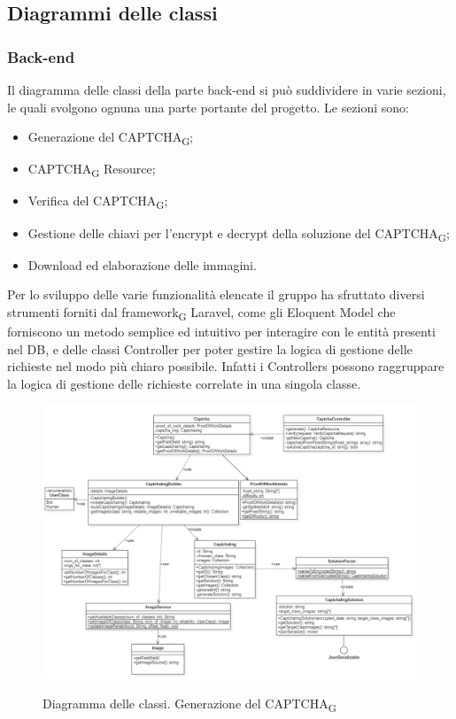 \subsection{Diagrammi delle classi}

\subsubsection{Back-end}

Il diagramma delle classi della parte back-end si può suddividere in varie sezioni, le quali svolgono ognuna una parte portante del progetto. Le sezioni sono:
\begin{itemize}
    \item Generazione del CAPTCHA\textsubscript{G};
    \item CAPTCHA\textsubscript{G} Resource;
    \item Verifica del CAPTCHA\textsubscript{G};
    \item Gestione delle chiavi per l'encrypt e decrypt della soluzione del CAPTCHA\textsubscript{G};
    \item Download ed elaborazione delle immagini.
\end{itemize}

Per lo sviluppo delle varie funzionalità elencate il gruppo ha sfruttato diversi strumenti forniti dal framework\textsubscript{G} Laravel, 
come gli Eloquent Model che forniscono un metodo semplice ed intuitivo per interagire con le entità presenti nel DB, e delle classi 
Controller per poter gestire la logica di gestione delle richieste nel modo più chiaro possibile. Infatti i Controllers possono 
raggruppare la logica di gestione delle richieste correlate in una singola classe.


\begin{figure}[H]
    \centering
    \includegraphics[scale = 0.45]{img/generate.png}\\
    \caption{Diagramma delle classi. Generazione del CAPTCHA\textsubscript{G}}
\end{figure}
\newpage

